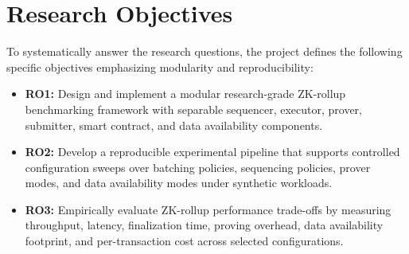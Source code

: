 \section{Research Objectives}
\label{sec:research_objectives}

To systematically answer the research questions, the project defines the following specific objectives emphasizing modularity and reproducibility:

\begin{itemize}
    \item \textbf{RO1:} Design and implement a modular research-grade ZK-rollup benchmarking framework with separable sequencer, executor, prover, submitter, smart contract, and data availability components.
    \item \textbf{RO2:} Develop a reproducible experimental pipeline that supports controlled configuration sweeps over batching policies, sequencing policies, prover modes, and data availability modes under synthetic workloads.
    \item \textbf{RO3:} Empirically evaluate ZK-rollup performance trade-offs by measuring throughput, latency, finalization time, proving overhead, data availability footprint, and per-transaction cost across selected configurations.
\end{itemize}
